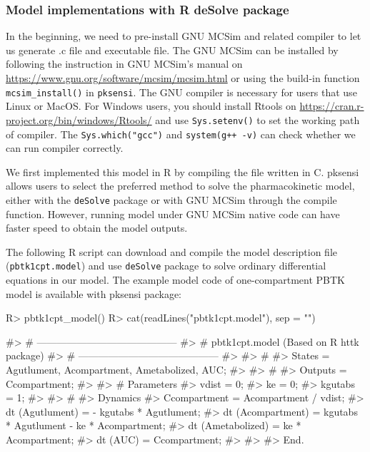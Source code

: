 \documentclass[article]{jss}
\begin{document}
\hypertarget{model-implementations-with-r-desolve-package}{%
\subsubsection{Model implementations with R deSolve
package}\label{model-implementations-with-r-desolve-package}}

In the beginning, we need to pre-install GNU MCSim \citep{JSSv002i09}
and related compiler to let us generate .c file and executable file. The
GNU MCSim can be installed by following the instruction in GNU MCSim's
manual on \url{https://www.gnu.org/software/mcsim/mcsim.html} or using
the build-in function \texttt{mcsim\_install()} in \texttt{pksensi}. The
GNU compiler is necessary for users that use Linux or MacOS. For Windows
users, you should install Rtools on
\url{https://cran.r-project.org/bin/windows/Rtools/} and use
\texttt{Sys.setenv()} to set the working path of compiler. The
\texttt{Sys.which("gcc")} and
\texttt{system(\textquotesingle{}g++\ -v\textquotesingle{})} can check
whether we can run compiler correctly.

We first implemented this model in R by compiling the file written in C.
pksensi allows users to select the preferred method to solve the
pharmacokinetic model, either with the \texttt{deSolve} package or with
GNU MCSim through the compile function. However, running model under GNU
MCSim native code can have faster speed to obtain the model outputs.

The following R script can download and compile the model description
file (\texttt{pbtk1cpt.model}) and use \texttt{deSolve} package
\citep{JSSv033i09} to solve ordinary differential equations in our
model. The example model code of one-compartment PBTK model is available
with pksensi package:

\begin{CodeChunk}

\begin{CodeInput}
R> pbtk1cpt_model()
R> cat(readLines("pbtk1cpt.model"), sep = "\n")
\end{CodeInput}

\begin{CodeOutput}
#> # ------------------------------------------
#> # pbtk1cpt.model (Based on R httk package)
#> # ------------------------------------------
#> 
#> #
#> States  = { Agutlument, Acompartment, Ametabolized, AUC};
#> 
#> #
#> Outputs = {Ccompartment};
#> 
#> # Parameters
#> vdist = 0;
#> ke = 0;
#> kgutabs = 1;
#> 
#> #
#> Dynamics {
#>   Ccompartment = Acompartment / vdist;
#>   dt (Agutlument)  = - kgutabs * Agutlument;
#>   dt (Acompartment)  = kgutabs * Agutlument - ke * Acompartment;
#>   dt (Ametabolized) = ke * Acompartment;
#>   dt (AUC) = Ccompartment;
#> }
#> 
#> End.
\end{CodeOutput}
\end{CodeChunk}
\end{document}

